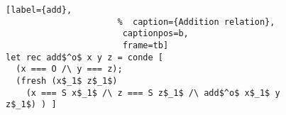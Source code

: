 \begin{figure}[!t]
  \centering
  \begin{minipage}{\columnwidth}
    \begin{lstlisting}[label={add},
                      %  caption={Addition relation},
                       captionpos=b,
                       frame=tb]
let rec add$^o$ x y z = conde [
  (x === O /\ y === z);
  (fresh (x$_1$ z$_1$)
    (x === S x$_1$ /\ z === S z$_1$ /\ add$^o$ x$_1$ y z$_1$) ) ]
    \end{lstlisting}
  \end{minipage}
\end{figure}